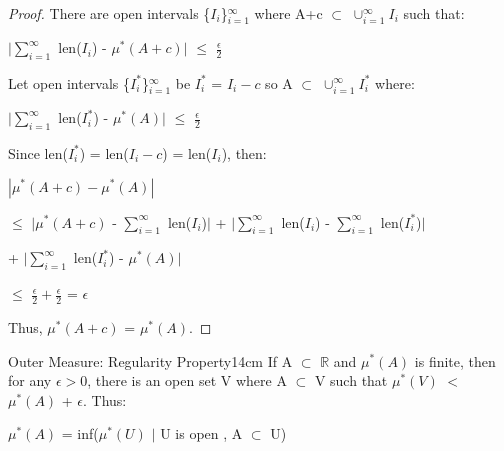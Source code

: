     \begin{proof}
        There are open intervals \{$I_i$\}$_{i=1}^{\infty}$
        where A+c $\subset$ $\cup_{i=1}^{\infty} I_i$ such that:

        \hspace{0.5cm}
        $|\sum_{i=1}^{\infty}$ len($I_i$) - $\mu^*(A+c)|$
        $\leq$ $\frac{\epsilon}{2}$

        Let open intervals \{$I_i^*$\}$_{i=1}^{\infty}$
        be $I_i^*$ = $I_i-c$ so A $\subset$ $\cup_{i=1}^{\infty} I_i^*$ where:

        \hspace{0.5cm}
        $|\sum_{i=1}^{\infty}$ len($I_i^*$) - $\mu^*(A)|$
        $\leq$ $\frac{\epsilon}{2}$

        Since len($I_i^*$) = len($I_i-c$) = len($I_i$), then:

        \hspace{0.5cm}
        $|\mu^*(A+c) - \mu^*(A)|$

        \hspace{0.5cm}
        $\leq$ $|\mu^*(A+c)$ - $\sum_{i=1}^{\infty}$ len($I_i$)$|$
                + $|\sum_{i=1}^{\infty}$ len($I_i$)
                    - $\sum_{i=1}^{\infty}$ len($I_i^*$)$|$
                
                \hspace{1cm}
                + $|\sum_{i=1}^{\infty}$ len($I_i^*$) - $\mu^*(A)|$

        \hspace{0.5cm}
        $\leq$ $\frac{\epsilon}{2} + \frac{\epsilon}{2}$
        = $\epsilon$

        Thus, $\mu^*(A+c)$ = $\mu^*(A)$.
    \end{proof}

    \vspace{0.5cm}



    \begin{wtheorem}{Outer Measure: Regularity Property}{14cm}
        If A $\subset$ $\mathbb{R}$ and $\mu^*(A)$ is finite,
        then for any $\epsilon > 0$, there is an open set V
        where A $\subset$ V such that
        $\mu^*(V)$ $<$ $\mu^*(A)$ + $\epsilon$. Thus:

        \hspace{0.5cm}
        $\mu^*(A)$ = inf($\mu^*(U)$ $|$ U is open , A $\subset$ U)
    \end{wtheorem}

